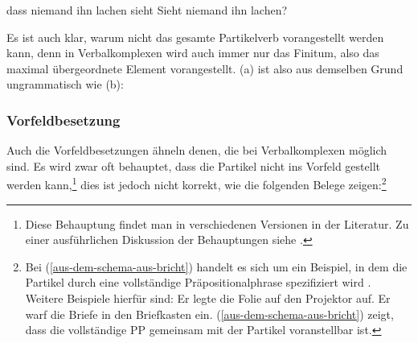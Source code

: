 \eal
\ex dass niemand ihn lachen sieht
\ex Sieht niemand ihn lachen?
\zl

\noindent
Es ist auch klar, warum nicht das gesamte Partikelverb vorangestellt werden kann,
denn in Verbalkomplexen wird auch immer nur das Finitum, also das maximal übergeordnete
Element vorangestellt. (a) ist also aus demselben Grund ungrammatisch wie (b):
\eal
{}
\zl

\subsubsection{Vorfeldbesetzung}
\label{sec-part-vorfeldbesetzung}

Auch die Vorfeldbesetzungen ähneln denen, die bei Verbalkomplexen
möglich sind. Es wird zwar oft behauptet, dass die Partikel nicht ins Vorfeld gestellt werden
kann,\footnote{
  Diese Behauptung findet man in verschiedenen Versionen in der Literatur. Zu einer
  ausführlichen Diskussion der Behauptungen siehe .%
} dies ist jedoch nicht korrekt, wie die folgenden Belege zeigen:\footnote{
Bei (\ref{aus-dem-schema-aus-bricht}) handelt es sich um ein Beispiel, in dem
die Partikel durch eine vollständige Präpositionalphrase spezifiziert wird \citep{Olsen97a,Olsen99a}.
Weitere Beispiele hierfür sind:
\eal
\ex Er legte die Folie auf den Projektor auf.
\ex Er warf die Briefe in den Briefkasten ein.
\zl 
(\ref{aus-dem-schema-aus-bricht}) zeigt, dass die vollständige PP gemeinsam mit der Partikel voranstellbar ist.%
}

